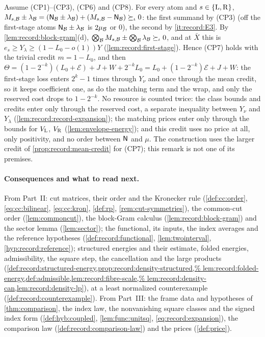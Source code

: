 \begin{remark}
\label{lem:record:domination}
Assume (CP1)--(CP3), (CP6) and (CP8). For every atom and
$s\in\{{\rm L},{\rm R}\}$,
$M_{s,\mathcal B}\pm\lambda_\mathcal B=(\mathsf N_\mathcal B\pm\lambda_\mathcal B)+(M_{s,\mathcal B}-\mathsf N_\mathcal B)
\succeq_\iota0$: the first summand by (CP3) (off the first-stage atoms
$\mathsf N_\mathcal B\pm\lambda_\mathcal B$ is $2\mu_\mathcal B$ or $0$), the second by
\ref{it:record:E3}. By \cref{lem:record:block-gram}(d),
$\bigotimes_\mathcal B M_{s,\mathcal B}\pm\bigotimes_\mathcal B\lambda_\mathcal B\succeq_\iota0$, and at
$\bar X$ this is $e_s\ge Y_\lambda\ge(1-L_0-o(1))Y$
(\cref{lem:record:first-stage}). Hence (CP7) holds with the trivial credit
$m=1-L_0$, and then
$\Theta=(1-2^{-k})(L_0+\mathcal E)+J+W+2^{-k}L_0=L_0+(1-2^{-k})\mathcal E+J+W$:
the first-stage loss enters $2^k-1$ times through $Y_\nu$ and once through
the mean credit, so it keeps coefficient one, as do the matching term and
the wrap, and only the reserved cost drops to $1-2^{-k}$. No resource is
counted twice: the class bounds and credits enter only through the reserved
cost, a separate inequality between $Y_\nu$ and $Y_\lambda$
(\cref{lem:record:record-expansion}); the matching prices enter only through
the bounds for $V_{\rm L}$, $V_{\rm R}$ (\cref{lem:envelope-energy}); and this
credit uses no price at all, only positivity, and no order between $\mathsf N$ and
$\mu$. The construction uses the larger credit of
\cref{prop:record:mean-credit} for (CP7); this remark is not one of its
premises.
\end{remark}

\paragraph{Consequences and what to read next.}
From Part~II: cut matrices, their order and the Kronecker rule
(\cref{def:cc:order}, \eqref{eq:cc:bilinear}, \eqref{eq:cc:kron},
\cref{def:rp}, \cref{rem:cut-symmetries}), the common-cut order (\cref{lem:commoncut}), the block-Gram
calculus (\cref{lem:record:block-gram}) and the sector lemma
(\cref{lem:sector}); the functional, its inputs, the index averages and the
reference hypotheses (\cref{def:record:functional}, \cref{lem:twointerval},
\cref{hyp:record:reference}); structured energies and their estimate, folded
energies, admissibility, the square step, the cancellation and the large
products
(\cref{def:record:structured-energy,prop:record:density-structured,%
lem:record:folded-energy,def:admissible,lem:record:fibre-scale,%
lem:record:density-can,lem:record:density-lp}), at a least normalized
counterexample (\cref{def:record:counterexample}). From Part~III: the frame
data and hypotheses of \cref{thm:comparison}, the index law, the nonvanishing square classes
and the signed index form (\cref{def:hyb:coupled}, \cref{lem:func:unitsq},
\eqref{eq:record:expansion}), the
comparison law (\cref{def:record:comparison-law}) and the prices
(\cref{def:price}).
